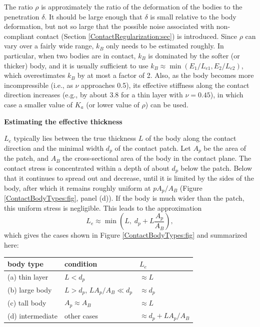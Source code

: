 The ratio $\rho$ is approximately the ratio of the deformation of the
bodies to the penetration $\delta$. It should be large enough that
$\delta$ is small relative to the body deformation, but not so large that
the possible noise associated with non-compliant contact (Section
\ref{ContactRegularization:sec}) is introduced. Since $\rho$ can vary
over a fairly wide range, $k_B$ only needs to be estimated roughly. In
particular, when two bodies are in contact, $k_B$ is dominated by the
softer (or thicker) body, and it is usually sufficient to use $k_B \approx
\min (E_1/L_{e1}, E_2/L_{e2})$, which overestimates $k_B$ by at most a
factor of 2.  Also, as the body becomes more incompressible (i.e., as
$\nu$ approaches 0.5), its effective stiffness along the contact
direction increases (e.g., by about 3.8 for a thin layer with $\nu =
0.45$), in which
case a smaller value of $K_a$ (or lower value of $\rho$) can be used.

{\bf Estimating the effective thickness}

$L_e$ typically lies between the true thickness $L$ of the body along
the contact direction and the minimal width $d_p$ of the contact
patch. Let $A_p$ be the area of the patch, and
$A_B$ the cross-sectional area of the body in the contact plane. The
contact stress is concentrated within a depth of about $d_p$ below the
patch. Below that it continues to spread out and decrease, until it is
limited by the sides of the body, after which it remains roughly
uniform at $p A_p/A_B$ (Figure \ref{ContactBodyTypes:fig}, panel
(d)). If the body is much wider than the patch, this uniform stress is
negligible. This leads to the approximation
%
\begin{equation*}
L_e \approx \min \left(L, \; d_p + L \frac{A_p}{A_B}\right),
\end{equation*}
%
which gives the cases shown in Figure \ref{ContactBodyTypes:fig} and
summarized here:

\begin{center}
\begin{tabular}{|lll|}
\hline
body type & condition & $L_e$ \\
\hline
(a) thin layer & $L < d_p$ & $\approx L$ \\
(b) large body & $L > d_p$, $L A_p/A_B \ll d_p$ & $\approx d_p$ \\
(c) tall body & $A_p \approx A_B$ & $\approx L$ \\
(d) intermediate & other cases & $\approx d_p + L A_p/A_B$ \\
\hline
\end{tabular}
\end{center}

